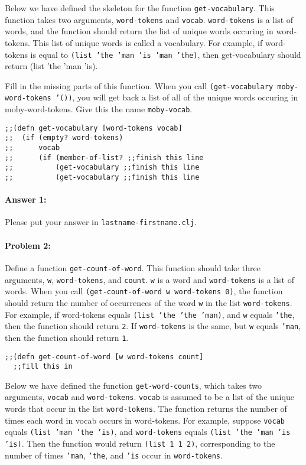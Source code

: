 \documentclass[10pt]{article}
\begin{document}
Below we have defined the skeleton for the function
\texttt{get-vocabulary}. This function takes two arguments,
\texttt{word-tokens} and \texttt{vocab}. \texttt{word-tokens} is a
list of words, and the function should return the list of unique words
occuring in word-tokens. This list of unique words is called a
vocabulary. For example, if word-tokens is equal to \texttt{(list 'the
  'man 'is 'man 'the)}, then get-vocabulary should return (list 'the
'man 'is).

Fill in the missing parts of this function. When you call
\texttt{(get-vocabulary moby-word-tokens '())}, you will get back a
list of all of the unique words occuring in moby-word-tokens. Give
this the name \texttt{moby-vocab}.

\begin{lstlisting}
;;(defn get-vocabulary [word-tokens vocab]
;;  (if (empty? word-tokens)
;;      vocab
;;      (if (member-of-list? ;;finish this line
;;          (get-vocabulary ;;finish this line
;;          (get-vocabulary ;;finish this line
\end{lstlisting}

\paragraph{Answer 1:} Please put your answer in \texttt{lastname-firstname.clj}.

\hrulefill
\paragraph{Problem 2:}

Define a function \texttt{get-count-of-word}. This function should
take three arguments, \texttt{w}, \texttt{word-tokens}, and
\texttt{count}. \texttt{w} is a word and \texttt{word-tokens} is a
list of words. When you call \texttt{(get-count-of-word w word-tokens
  0)}, the function should return the number of occurrences of the
word \texttt{w} in the list \texttt{word-tokens}. For example, if
word-tokens equals \texttt{(list 'the 'the 'man)}, and \texttt{w}
equals \texttt{'the}, then the function should return \texttt{2}. If
\texttt{word-tokens} is the same, but \texttt{w} equals \texttt{'man},
then the function should return \texttt{1}.

\begin{lstlisting}
;;(defn get-count-of-word [w word-tokens count]
  ;;fill this in
\end{lstlisting}

Below we have defined the function \texttt{get-word-counts}, which
takes two arguments, \texttt{vocab} and
\texttt{word-tokens}. \texttt{vocab} is assumed to be a list of the
unique words that occur in the list \texttt{word-tokens}. The function
returns the number of times each word in vocab occurs in
word-tokens. For example, suppose \texttt{vocab} equals \texttt{(list
  'man 'the 'is)}, and \texttt{word-tokens} equals \texttt{(list 'the
  'man 'is 'is)}. Then the function would return \texttt{(list 1 1
  2)}, corresponding to the number of times \texttt{'man},
\texttt{'the}, and \texttt{'is} occur in \texttt{word-tokens}.
\end{document}
